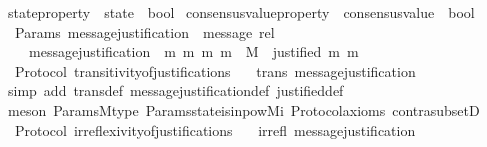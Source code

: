 \begin{isabellebody}
\ state{\isacharunderscore}property\ {\isacharequal}\ {\isachardoublequoteopen}state\ {\isasymRightarrow}\ bool{\isachardoublequoteclose}\isanewline
\isanewline
\isanewline
{}\isamarkupfalse%
\ consensus{\isacharunderscore}value{\isacharunderscore}property\ {\isacharequal}\ {\isachardoublequoteopen}consensus{\isacharunderscore}value\ {\isasymRightarrow}\ bool{\isachardoublequoteclose}\isanewline
\isanewline
\isanewline
\isanewline
\isanewline
\isanewline
\isanewline
{}\isamarkupfalse%
\ {\isacharparenleft}\ Params{\isacharparenright}\ message{\isacharunderscore}justification\ {\isacharcolon}{\isacharcolon}\ {\isachardoublequoteopen}message\ rel{\isachardoublequoteclose}\isanewline
\ \ \ \isanewline
\ \ \ \ {\isachardoublequoteopen}message{\isacharunderscore}justification\ {\isacharequal}\ {\isacharbraceleft}{\isacharparenleft}m{}{\isacharcomma}\ m{}{\isacharparenright}{\isachardot}\ {\isacharbraceleft}m{}{\isacharcomma}\ m{}{\isacharbraceright}\ {\isasymsubseteq}\ M\ {\isasymand}\ justified\ m{}\ m{}{\isacharbraceright}{\isachardoublequoteclose}\ \isanewline
\isanewline
{}\isamarkupfalse%
\ {\isacharparenleft}\ Protocol{\isacharparenright}\ transitivity{\isacharunderscore}of{\isacharunderscore}justifications\ {\isacharcolon}\isanewline
\ \ {\isachardoublequoteopen}trans\ message{\isacharunderscore}justification{\isachardoublequoteclose}\isanewline
%
\isadelimproof
\ \ %
\endisadelimproof
%
\isatagproof
{}\isamarkupfalse%
\ {\isacharparenleft}simp\ add{\isacharcolon}\ trans{\isacharunderscore}def\ message{\isacharunderscore}justification{\isacharunderscore}def\ justified{\isacharunderscore}def{\isacharparenright}\isanewline
\ \ \isamarkupfalse%
\ {\isacharparenleft}meson\ Params{\isachardot}M{\isacharunderscore}type\ Params{\isachardot}state{\isacharunderscore}is{\isacharunderscore}in{\isacharunderscore}pow{\isacharunderscore}M{\isacharunderscore}i\ Protocol{\isacharunderscore}axioms\ contra{\isacharunderscore}subsetD{\isacharparenright}%
\endisatagproof
{\isafoldproof}%
%
\isadelimproof
\isanewline
%
\endisadelimproof
\isanewline
{}\isamarkupfalse%
\ {\isacharparenleft}\ Protocol{\isacharparenright}\ irreflexivity{\isacharunderscore}of{\isacharunderscore}justifications\ {\isacharcolon}\isanewline
\ \ {\isachardoublequoteopen}irrefl\ message{\isacharunderscore}justification{\isachardoublequoteclose}\isanewline

\end{isabellebody}
